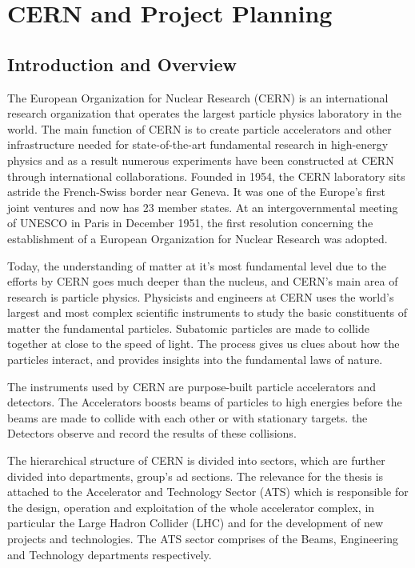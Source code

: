 \let\textcircled=\pgftextcircled
\chapter{CERN and Project Planning}
\label{chap:ch3}

\section{Introduction and Overview}
The European Organization for Nuclear Research (CERN) is an international research organization that operates the largest particle physics laboratory in the world.  The main function of CERN is to create particle accelerators and other infrastructure needed for state-of-the-art fundamental research in high-energy physics and as a result numerous experiments have been constructed at CERN through international collaborations. Founded in 1954, the CERN laboratory sits astride the French-Swiss border near Geneva. It was one of the Europe's first joint ventures and now has 23 member states. At an intergovernmental meeting of UNESCO in Paris in December 1951, the first resolution concerning the establishment of a European Organization for Nuclear Research was adopted.

Today, the understanding of matter at it's most fundamental level due to the efforts by CERN goes much deeper than the nucleus, and CERN's main area of research is particle physics. Physicists and engineers at CERN uses the world's largest and most complex scientific instruments to study the basic constituents of matter the fundamental particles. Subatomic particles are made to collide together at close to the speed of light. The process gives us clues about how the particles interact, and provides insights into the fundamental laws of nature.

The instruments used by CERN are purpose-built particle accelerators and detectors. The Accelerators boosts beams of particles to high energies before the beams are made to collide with each other or with stationary targets. the Detectors observe and record the results of these collisions.

The hierarchical structure of CERN is divided into sectors, which are further divided into departments, group's ad sections. The relevance for the thesis is attached to the Accelerator and Technology Sector (ATS) which is responsible for the design, operation and exploitation of the whole accelerator complex, in particular the Large Hadron Collider (LHC) and for the development of new projects and technologies. The ATS sector comprises of the Beams, Engineering and Technology departments respectively. 

